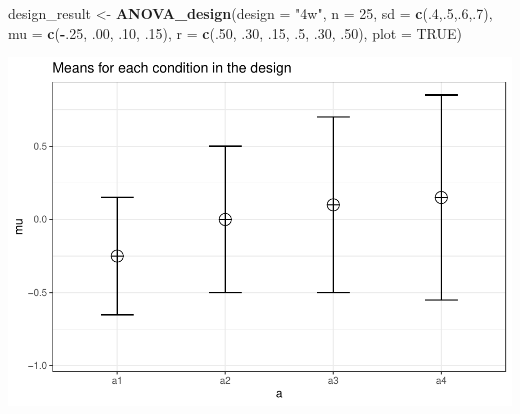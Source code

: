 \documentclass[]{book}
\newenvironment{Shaded}{\begin{snugshade}}{\end{snugshade}}
\newcommand{\DataTypeTok}[1]{\textcolor[rgb]{0.13,0.29,0.53}{#1}}
\newcommand{\DecValTok}[1]{\textcolor[rgb]{0.00,0.00,0.81}{#1}}
\newcommand{\FloatTok}[1]{\textcolor[rgb]{0.00,0.00,0.81}{#1}}
\newcommand{\KeywordTok}[1]{\textcolor[rgb]{0.13,0.29,0.53}{\textbf{#1}}}
\newcommand{\NormalTok}[1]{#1}
\newcommand{\OperatorTok}[1]{\textcolor[rgb]{0.81,0.36,0.00}{\textbf{#1}}}
\newcommand{\OtherTok}[1]{\textcolor[rgb]{0.56,0.35,0.01}{#1}}
\newcommand{\StringTok}[1]{\textcolor[rgb]{0.31,0.60,0.02}{#1}}
\begin{document}
\begin{Shaded}
\begin{Highlighting}[]
\NormalTok{design_result <-}\StringTok{ }\KeywordTok{ANOVA_design}\NormalTok{(}\DataTypeTok{design =} \StringTok{"4w"}\NormalTok{,}
                              \DataTypeTok{n =} \DecValTok{25}\NormalTok{,}
                              \DataTypeTok{sd =} \KeywordTok{c}\NormalTok{(.}\DecValTok{4}\NormalTok{,.}\DecValTok{5}\NormalTok{,.}\DecValTok{6}\NormalTok{,.}\DecValTok{7}\NormalTok{),}
                              \DataTypeTok{mu =} \KeywordTok{c}\NormalTok{(}\OperatorTok{-}\NormalTok{.}\DecValTok{25}\NormalTok{, }\FloatTok{.00}\NormalTok{, }\FloatTok{.10}\NormalTok{, }\FloatTok{.15}\NormalTok{),}
                              \DataTypeTok{r =} \KeywordTok{c}\NormalTok{(.}\DecValTok{50}\NormalTok{, }
                                    \FloatTok{.30}\NormalTok{,}
                                    \FloatTok{.15}\NormalTok{, }
                                    \FloatTok{.5}\NormalTok{,}
                                    \FloatTok{.30}\NormalTok{, }
                                    \FloatTok{.50}\NormalTok{),}
                              \DataTypeTok{plot =} \OtherTok{TRUE}\NormalTok{)}
\end{Highlighting}
\end{Shaded}

\includegraphics{SuperpowerValidation_files/figure-latex/aberson_6.2-1.pdf}

\begin{Shaded}
\end{Shaded}
\end{document}
